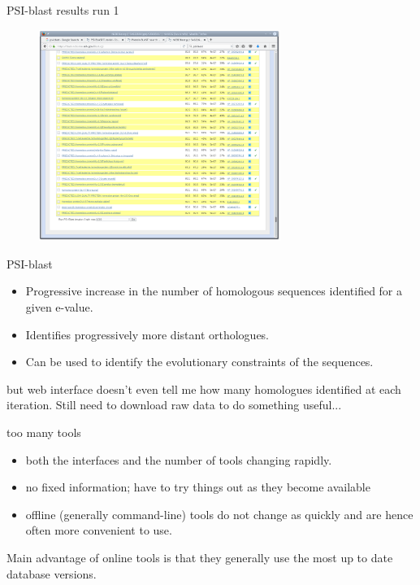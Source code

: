 \documentclass[pdf]{beamer}
\begin{document}
\begin{frame}{PSI-blast results run 1}
  \begin{figure}[ht]
    \includegraphics[width=0.7\textwidth]{images/ncbi_psi_blast_5.png}
  \end{figure}
\end{frame}

\begin{frame}{PSI-blast}
  \begin{itemize}
  \item Progressive increase in the number of homologous sequences identified for a
  given e-value.
  \item Identifies progressively more distant orthologues.
  \item Can be used to identify the evolutionary constraints of the sequences.
  \end{itemize}

  but web interface doesn't even tell me how many homologues identified at
  each iteration. Still need to download raw data to do something useful...
\end{frame}

\begin{frame}{too many tools}
  \begin{itemize}
  \item both the interfaces and the number of tools changing rapidly.
  \item no fixed information; have to try things out as they become available
  \item  offline (generally command-line) tools do not change as quickly and are
  hence often more convenient to use.
  \end{itemize}

  Main advantage of online tools is that they generally use the most up to
  date database versions.
\end{frame}
\end{document}
